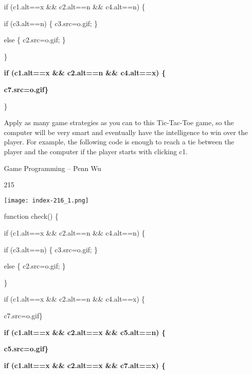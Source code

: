 \documentclass[
]{article}
\begin{document}
if (c1.alt==\textquotesingle x\textquotesingle{} \&\&
c2.alt==\textquotesingle n\textquotesingle{} \&\&
c4.alt==\textquotesingle n\textquotesingle) \{

if (c3.alt==\textquotesingle n\textquotesingle) \{
c3.src=\textquotesingle o.gif\textquotesingle; \}

else \{ c2.src=\textquotesingle o.gif\textquotesingle; \}

\}

\textbf{if (c1.alt==\textquotesingle x\textquotesingle{} \&\&
c2.alt==\textquotesingle n\textquotesingle{} \&\&
c4.alt==\textquotesingle x\textquotesingle) \{}

\textbf{c7.src=\textquotesingle o.gif\textquotesingle\}}

\}

Apply as many game strategies as you can to this Tic-Tac-Toe game, so
the computer will be very smart and eventually have the intelligence to
win over the player. For example, the following code is enough to reach
a tie between the player and the computer if the player starts with
clicking c1.

Game Programming -- Penn Wu

215

\protect\hypertarget{index_split_011.htmlux5cux23p216}{}{}\texttt{[image: index-216\_1.png]}

function check() \{

if (c1.alt==\textquotesingle x\textquotesingle{} \&\&
c2.alt==\textquotesingle n\textquotesingle{} \&\&
c4.alt==\textquotesingle n\textquotesingle) \{

if (c3.alt==\textquotesingle n\textquotesingle) \{
c3.src=\textquotesingle o.gif\textquotesingle; \}

else \{ c2.src=\textquotesingle o.gif\textquotesingle; \}

\}

if (c1.alt==\textquotesingle x\textquotesingle{} \&\&
c2.alt==\textquotesingle n\textquotesingle{} \&\&
c4.alt==\textquotesingle x\textquotesingle) \{

c7.src=\textquotesingle o.gif\textquotesingle\}

\textbf{if (c1.alt==\textquotesingle x\textquotesingle{} \&\&
c2.alt==\textquotesingle x\textquotesingle{} \&\&
c5.alt==\textquotesingle n\textquotesingle) \{}

\textbf{c5.src=\textquotesingle o.gif\textquotesingle\}}

\textbf{if (c1.alt==\textquotesingle x\textquotesingle{} \&\&
c2.alt==\textquotesingle x\textquotesingle{} \&\&
c7.alt==\textquotesingle x\textquotesingle) \{}
\end{document}
